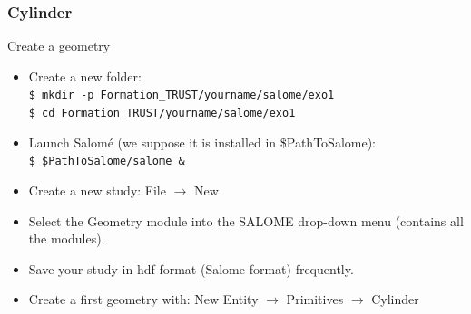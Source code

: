 \documentclass[10pt, hyperref={unicode=true,pdfusetitle, bookmarks=true,bookmarksnumbered=false,bookmarksopen=false, breaklinks=false,pdfborder={0 0 1},backref=true,colorlinks=true,linkcolor=darkblue,pageanchor}]{beamer}
\begin{document}
\begin{frame}
\frametitle{Cylinder}
\begin{block}{Create a geometry}

\begin{itemize}
\item Create a new folder:\\
\texttt{\$ mkdir -p Formation\_TRUST/yourname/salome/exo1} \\
\texttt{\$ cd Formation\_TRUST/yourname/salome/exo1} \\

\item Launch Salom\'e (we suppose it is installed in \$PathToSalome):\\
\texttt{\$ \$PathToSalome/salome \&} 

\item Create a new study: File $\rightarrow$ New

\item Select the Geometry module into the SALOME drop-down menu (contains all the modules).

\item Save your study in hdf format (Salome format) frequently.

\item Create a first geometry with: New Entity $\rightarrow$ Primitives $\rightarrow$ Cylinder
\end{itemize}

\end{block}
\end{frame}
\end{document}
